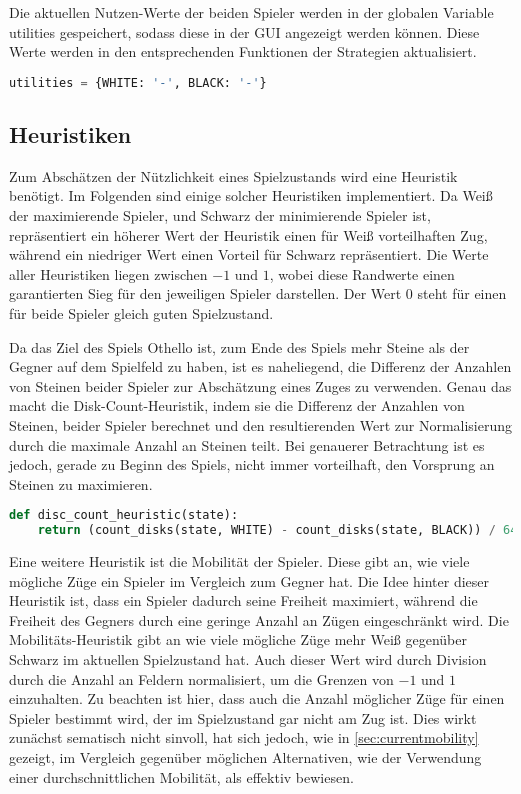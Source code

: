 Die aktuellen Nutzen-Werte der beiden Spieler werden in der globalen
Variable utilities gespeichert, sodass diese in der GUI angezeigt werden
können. Diese Werte werden in den entsprechenden Funktionen der
Strategien aktualisiert.

\begin{lstlisting}[language=Python]
utilities = {WHITE: '-', BLACK: '-'}
\end{lstlisting}

\hypertarget{heuristiken}{%
\subsection{Heuristiken}\label{heuristiken}}

Zum Abschätzen der Nützlichkeit eines Spielzustands wird eine Heuristik
benötigt. Im Folgenden sind einige solcher Heuristiken implementiert. Da
Weiß der maximierende Spieler, und Schwarz der minimierende Spieler ist,
repräsentiert ein höherer Wert der Heuristik einen für Weiß
vorteilhaften Zug, während ein niedriger Wert einen Vorteil für Schwarz
repräsentiert. Die Werte aller Heuristiken liegen zwischen \(-1\) und
\(1\), wobei diese Randwerte einen garantierten Sieg für den jeweiligen
Spieler darstellen. Der Wert \(0\) steht für einen für beide Spieler
gleich guten Spielzustand.

Da das Ziel des Spiels Othello ist, zum Ende des Spiels mehr Steine als
der Gegner auf dem Spielfeld zu haben, ist es naheliegend, die Differenz
der Anzahlen von Steinen beider Spieler zur Abschätzung eines Zuges zu
verwenden. Genau das macht die Disk-Count-Heuristik, indem sie die
Differenz der Anzahlen von Steinen, beider Spieler berechnet und den
resultierenden Wert zur Normalisierung durch die maximale Anzahl an
Steinen teilt. Bei genauerer Betrachtung ist es jedoch, gerade zu Beginn
des Spiels, nicht immer vorteilhaft, den Vorsprung an Steinen zu
maximieren.

\begin{lstlisting}[language=Python]
def disc_count_heuristic(state):
    return (count_disks(state, WHITE) - count_disks(state, BLACK)) / 64
\end{lstlisting}

Eine weitere Heuristik ist die Mobilität der Spieler. Diese gibt an, wie
viele mögliche Züge ein Spieler im Vergleich zum Gegner hat. Die Idee
hinter dieser Heuristik ist, dass ein Spieler dadurch seine Freiheit
maximiert, während die Freiheit des Gegners durch eine geringe Anzahl an
Zügen eingeschränkt wird. Die Mobilitäts-Heuristik gibt an wie viele
mögliche Züge mehr Weiß gegenüber Schwarz im aktuellen Spielzustand hat.
Auch dieser Wert wird durch Division durch die Anzahl an Feldern
normalisiert, um die Grenzen von \(-1\) und \(1\) einzuhalten. Zu
beachten ist hier, dass auch die Anzahl möglicher Züge für einen Spieler
bestimmt wird, der im Spielzustand gar nicht am Zug ist. Dies wirkt
zunächst sematisch nicht sinvoll, hat sich jedoch, wie in
\autoref{sec:currentmobility} gezeigt, im Vergleich gegenüber möglichen
Alternativen, wie der Verwendung einer durchschnittlichen Mobilität, als
effektiv bewiesen.

